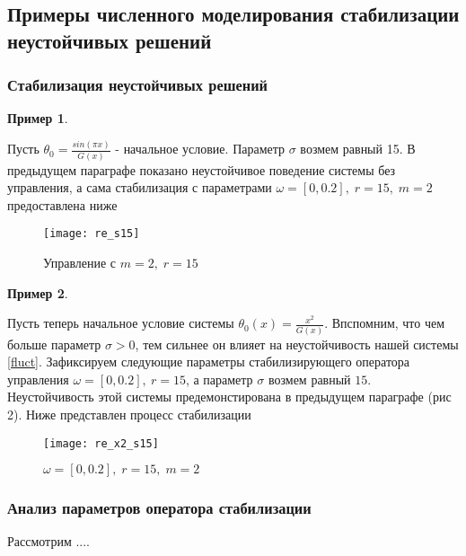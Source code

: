 \subsection{Примеры численного моделирования стабилизации неустойчивых решений}

\subsubsection{Стабилизация неустойчивых решений}

\newtheorem{exmp_stbur}{Пример}

\begin{exmp_stbur}
\end{exmp_stbur}

Пусть $\theta_0 = \frac{sin(\pi x)}{G(x)}$ - начальное условие. 
Параметр $\sigma$ возмем равный 15. В предыдущем параграфе показано неустойчивое 
поведение системы без управления, а сама стабилизация с параметрами 
$\omega = [0, 0.2], \; r = 15, \; m = 2$ предоставлена ниже


\begin{figure}[H]
  \centering
  \texttt{[image: re\_s15]}
  \caption{Управление с $m = 2, \; r = 15$}
  \label{fig:test2}
\end{figure}





\begin{exmp_stbur}
\end{exmp_stbur}
Пусть теперь начальное условие системы $\theta_0(x) = \frac{x^2}{G(x)}$.
Впспомним, что чем больше параметр $\sigma > 0$, тем сильнее он влияет на
неустойчивость нашей системы \eqref{fluct}. Зафиксируем следующие параметры
стабилизирующего оператора управления $\omega = [0, 0.2], \ r = 15$, а параметр 
$\sigma$  возмем равный $15$. Неустойчивость этой системы предемонстирована в
предыдущем параграфе (рис 2). Ниже представлен процесс стабилизации

\begin{figure}[H]
 \centering
  \texttt{[image: re\_x2\_s15]}
  \caption{$\omega = [0, 0.2], \; r = 15, \; m = 2$}
  \label{fig:test2}
\end{figure}

\subsubsection{Анализ параметров оператора стабилизации}

Рассмотрим ....

